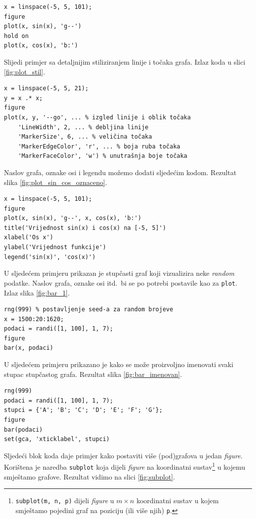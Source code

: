 \documentclass[a4paper, 10pt]{article}
\begin{document}
\begin{lstlisting}
x = linspace(-5, 5, 101);
figure
plot(x, sin(x), 'g--')
hold on
plot(x, cos(x), 'b:')
\end{lstlisting}

Slijedi primjer sa detaljnijim stiliziranjem linije i točaka grafa.
Izlaz koda u slici \ref{fig:plot_stil}.

\begin{lstlisting}
x = linspace(-5, 5, 21);
y = x .* x;
figure
plot(x, y, '--go', ... % izgled linije i oblik točaka
    'LineWidth', 2, ... % debljina linije
    'MarkerSize', 6, ... % veličina točaka
    'MarkerEdgeColor', 'r', ... % boja ruba točaka
    'MarkerFaceColor', 'w') % unutrašnja boje točaka
\end{lstlisting}

Naslov grafa, oznake osi i legendu možemo dodati sljedećim kodom.
Rezultat slika \ref{fig:plot_sin_cos_oznaceno}.

\begin{lstlisting}
x = linspace(-5, 5, 101);
figure
plot(x, sin(x), 'g--', x, cos(x), 'b:')
title('Vrijednost sin(x) i cos(x) na [-5, 5]')
xlabel('Os x')
ylabel('Vrijednost funkcije')
legend('sin(x)', 'cos(x)')
\end{lstlisting}

U sljedećem primjeru prikazan je stupčasti graf koji vizualizira neke \emph{random} podatke.
Naslov grafa, oznake osi itd.\ bi se po potrebi postavile kao za \texttt{plot}.
Izlaz slika \ref{fig:bar_1}.

\begin{lstlisting}
rng(999) % postavljenje seed-a za random brojeve
x = 1500:20:1620;
podaci = randi([1, 100], 1, 7);
figure
bar(x, podaci)
\end{lstlisting}

U sljedećem primjeru prikazano je kako se može proizvoljno imenovati svaki stupac stupčastog grafa.
Rezultat slika \ref{fig:bar_imenovan}.

\begin{lstlisting}
rng(999)
podaci = randi([1, 100], 1, 7);
stupci = {'A'; 'B'; 'C'; 'D'; 'E'; 'F'; 'G'};
figure
bar(podaci)
set(gca, 'xticklabel', stupci)
\end{lstlisting}

Sljedeći blok koda daje primjer kako postaviti više (pod)grafova u jedan \emph{figure}.
Korištena je naredba \texttt{subplot} koja dijeli \emph{figure} na koordinatni sustav\footnote{\texttt{subplot(m, n, p)} dijeli \emph{figure} u $m \times n$ koordinatni sustav u kojem smještamo pojedini graf na poziciju (ili više njih) \texttt{p}.} u kojemu smještamo grafove.
Rezultat vidimo na slici \ref{fig:subplot}.
\end{document}
